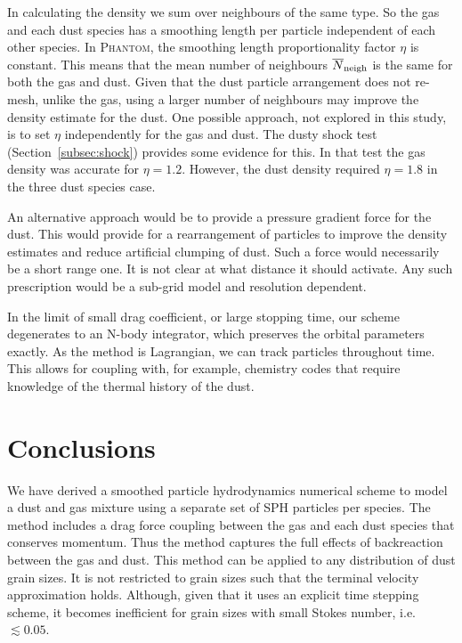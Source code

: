\documentclass[fleqn,usenatbib]{mnras}
\begin{document}
In calculating the density we sum over neighbours of the same type. So the gas
and each dust species has a smoothing length per particle independent of each
other species. In \textsc{Phantom}, the smoothing length proportionality factor
\(\eta\) is constant. This means that the mean number of neighbours
\(\overline{N}_{\rm neigh}\) is the same for both the gas and dust. Given that
the dust particle arrangement does not re-mesh, unlike the gas, using a larger
number of neighbours may improve the density estimate for the dust. One possible
approach, not explored in this study, is to set \(\eta\) independently for the
gas and dust. The dusty shock test (Section~\ref{subsec:shock}) provides some
evidence for this. In that test the gas density was accurate for \(\eta = 1.2\).
However, the dust density required \(\eta = 1.8\) in the three dust species
case.

An alternative approach would be to provide a pressure gradient force for the
dust. This would provide for a rearrangement of particles to improve the density
estimates and reduce artificial clumping of dust. Such a force would necessarily
be a short range one. It is not clear at what distance it should activate. Any
such prescription would be a sub-grid model and resolution dependent.

In the limit of small drag coefficient, or large stopping time, our scheme
degenerates to an N-body integrator, which preserves the orbital parameters
exactly. As the method is Lagrangian, we can track particles throughout time.
This allows for coupling with, for example, chemistry codes that require
knowledge of the thermal history of the dust.


\section{Conclusions}

We have derived a smoothed particle hydrodynamics numerical scheme to model a
dust and gas mixture using a separate set of SPH particles per species. The
method includes a drag force coupling between the gas and each dust species that
conserves momentum. Thus the method captures the full effects of backreaction
between the gas and dust. This method can be applied to any distribution of dust
grain sizes. It is not restricted to grain sizes such that the terminal velocity
approximation holds. Although, given that it uses an explicit time stepping
scheme, it becomes inefficient for grain sizes with small Stokes number, i.e.
\(\lesssim 0.05\).
\end{document}
